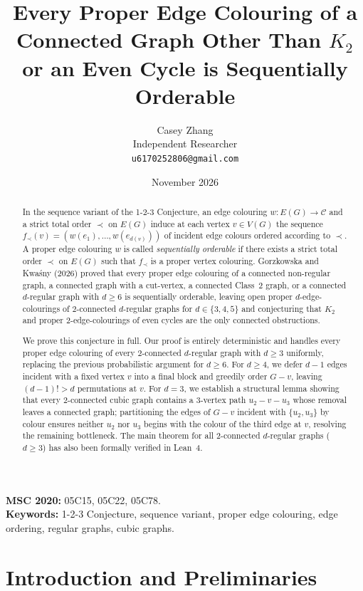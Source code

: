 \documentclass[11pt,a4paper]{article}
\title{Every Proper Edge Colouring of a Connected Graph Other Than $K_2$ or an Even Cycle is Sequentially Orderable}
\author{Casey Zhang\\
\small Independent Researcher\\
\small \texttt{u6170252806@gmail.com}}
\date{November 2026}
\begin{document}
\maketitle

\begin{abstract}
In the sequence variant of the 1-2-3 Conjecture, an edge colouring $w : E(G) \to \mathcal{C}$ and a strict total order $\prec$ on $E(G)$ induce at each vertex $v \in V(G)$ the sequence $f_\prec(v) = (w(e_1), \dots, w(e_{d(v)}))$ of incident edge colours ordered according to $\prec$. A proper edge colouring $w$ is called \emph{sequentially orderable} if there exists a strict total order $\prec$ on $E(G)$ such that $f_\prec$ is a proper vertex colouring. Gorzkowska and Kwa\'sny (2026) proved that every proper edge colouring of a connected non-regular graph, a connected graph with a cut-vertex, a connected Class~2 graph, or a connected $d$-regular graph with $d \ge 6$ is sequentially orderable, leaving open proper $d$-edge-colourings of $2$-connected $d$-regular graphs for $d \in \{3, 4, 5\}$ and conjecturing that $K_2$ and proper $2$-edge-colourings of even cycles are the only connected obstructions.

We prove this conjecture in full. Our proof is entirely deterministic and handles every proper edge colouring of every $2$-connected $d$-regular graph with $d \ge 3$ uniformly, replacing the previous probabilistic argument for $d \ge 6$. For $d \ge 4$, we defer $d-1$ edges incident with a fixed vertex $v$ into a final block and greedily order $G - v$, leaving $(d-1)! > d$ permutations at $v$. For $d = 3$, we establish a structural lemma showing that every $2$-connected cubic graph contains a $3$-vertex path $u_2 - v - u_3$ whose removal leaves a connected graph; partitioning the edges of $G - v$ incident with $\{u_2, u_3\}$ by colour ensures neither $u_2$ nor $u_3$ begins with the colour of the third edge at $v$, resolving the remaining bottleneck. The main theorem for all $2$-connected $d$-regular graphs ($d \ge 3$) has also been formally verified in Lean~4.
\end{abstract}

\noindent\textbf{MSC 2020:} 05C15, 05C22, 05C78.\\
\textbf{Keywords:} 1-2-3 Conjecture, sequence variant, proper edge colouring, edge ordering, regular graphs, cubic graphs.

\section{Introduction and Preliminaries}
\end{document}
